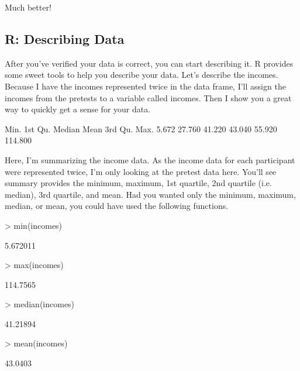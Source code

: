 \documentclass[12pt]{article}
\begin{document}
Much better!



\subsection{R: Describing Data}
After you've verified your data is correct, you can start describing it. R provides
some sweet tools to help you describe your data. Let's describe the incomes. Because
I have the incomes represented twice in the data frame, I'll assign the incomes from
the pretests to a variable called incomes. Then I show you a great way to quickly
get a sense for your data.

\begin{Schunk}
\begin{Soutput}
   Min. 1st Qu.  Median    Mean 3rd Qu.    Max. 
  5.672  27.760  41.220  43.040  55.920 114.800 
\end{Soutput}
\end{Schunk}

Here, I'm summarizing the income data. As the income data for each participant were
represented twice, I'm only looking at the pretest data here. You'll see summary
provides the minimum, maximum, 1st quartile, 2nd quartile (i.e. median), 3rd quartile,
and mean. Had you wanted only the minimum, maximum, median, or mean, you could have
used the following functions.

\begin{Schunk}
\begin{Sinput}
> min(incomes)
\end{Sinput}
\begin{Soutput}
[1] 5.672011
\end{Soutput}
\begin{Sinput}
> max(incomes)
\end{Sinput}
\begin{Soutput}
[1] 114.7565
\end{Soutput}
\begin{Sinput}
> median(incomes)
\end{Sinput}
\begin{Soutput}
[1] 41.21894
\end{Soutput}
\begin{Sinput}
> mean(incomes)
\end{Sinput}
\begin{Soutput}
[1] 43.0403
\end{Soutput}
\end{Schunk}
\end{document}
